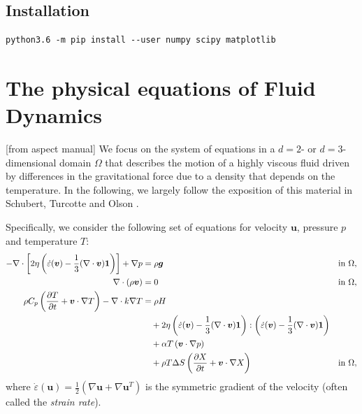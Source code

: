 \documentclass[a4paper]{article}
\begin{document}
\subsection{Installation}

\begin{verbatim}
python3.6 -m pip install --user numpy scipy matplotlib
\end{verbatim}



\newpage
\section{The physical equations of Fluid Dynamics}

[from aspect manual]
We focus on the system of equations in a $d=2$- or $d=3$-dimensional
domain $\Omega$ that describes the motion of a highly viscous fluid driven
by differences in the gravitational force due to a density that depends on
the temperature. In the following, we largely follow the exposition of this
material in Schubert, Turcotte and Olson \cite{scto01}.

Specifically, we consider the following set of equations for velocity $\mathbf
u$, pressure $p$ and temperature $T$:
\begin{align}
  \label{eq:stokes-1}
  -\nabla \cdot \left[2\eta \left(\dot\varepsilon(\bm v)
                                  - \frac{1}{3}(\nabla \cdot \bm v)\mathbf 1\right)
                \right] + \nabla p &=
  \rho \bm g
  &
  & \textrm{in $\Omega$},
  \\
  \label{eq:stokes-2}
  \nabla \cdot (\rho \bm v) &= 0
  &
  & \textrm{in $\Omega$},
  \\
  \label{eq:temperature}
  \rho C_p \left(\frac{\partial T}{\partial t} + \bm v\cdot\nabla T\right)
  - \nabla\cdot k\nabla T
  &=
  \rho H
  \notag
  \\
  &\quad
  +
  2\eta
  \left(\dot\varepsilon(\bm v) - \frac{1}{3}(\nabla \cdot \bm v)\mathbf 1\right)
  :
  \left(\dot\varepsilon(\bm v) - \frac{1}{3}(\nabla \cdot \bm v)\mathbf 1\right)
  \\
  &\quad
  +\alpha T \left( \bm v \cdot \nabla p \right)
  \notag
  \\
  &\quad
  + \rho T \Delta S \left(\frac{\partial X}{\partial t} + \bm v\cdot\nabla X\right)
  &
  & \textrm{in $\Omega$},
  \notag
\end{align}
where $\dot\varepsilon(\mathbf u) = \frac{1}{2}(\nabla \mathbf u + \nabla\mathbf
u^T)$ is the symmetric gradient of the velocity (often called the
\textit{strain rate}).%
\end{document}
